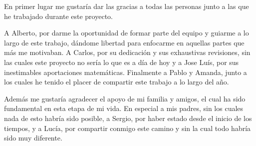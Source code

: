 En primer lugar me gustaría dar las gracias a todas las personas junto a las que
he trabajado durante este proyecto.

A Alberto, por darme la oportunidad de formar parte del equipo y
guiarme a lo largo de este trabajo, dándome libertad
para enfocarme en aquellas partes que más me motivaban. A Carlos, por su dedicación
y sus exhaustivas revisiones, sin las cuales este proyecto no sería lo que es
a día de hoy y a Jose Luís, por sus inestimables aportaciones
matemáticas. Finalmente a Pablo y Amanda, junto a los
cuales he tenido el placer de compartir este trabajo a lo largo del año.

Además me gustaría agradecer el apoyo de mi familia y amigos, el cual ha
sido fundamental en esta etapa de mi vida. En especial a mis padres, sin los
cuales nada de esto habría sido posible, a Sergio, por haber estado
desde el inicio de los tiempos, y a Lucía, por compartir conmigo este
camino y sin la cual todo habría sido muy diferente.
